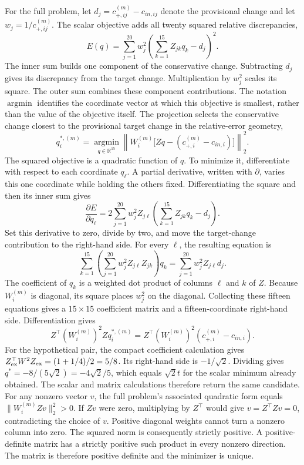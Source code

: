 For the full problem, let $d_j=c_{+,ij}^{(m)}-c_{in,ij}$ denote the provisional change and let $w_j=1/c_{+,ij}^{(m)}$. The scalar objective adds all twenty squared relative discrepancies,
\[
E(q)=\sum_{j=1}^{20}
w_j^2\left(\sum_{k=1}^{15}Z_{jk}q_k-d_j\right)^2.
\]
The inner sum builds one component of the conservative change. Subtracting $d_j$ gives its discrepancy from the target change. Multiplication by $w_j^2$ scales its square. The outer sum combines these component contributions. The notation $\operatorname{argmin}$ identifies the coordinate vector at which this objective is smallest, rather than the value of the objective itself. The projection selects the conservative change closest to the provisional target change in the relative-error geometry,
\begin{equation}
q_i^{*,(m)}=\underset{q\in\mathbb{R}^{15}}{\operatorname{argmin}}
\left\|W_i^{(m)}\bigl[Zq-(c_{+,i}^{(m)}-c_{in,i})\bigr]\right\|_2^2.
\label{eq:projection_weighted_least_squares}
\end{equation}
The squared objective is a quadratic function of $q$. To minimize it, differentiate with respect to each coordinate $q_\ell$. A partial derivative, written with $\partial$, varies this one coordinate while holding the others fixed. Differentiating the square and then its inner sum gives
\[
\frac{\partial E}{\partial q_\ell}
=2\sum_{j=1}^{20}w_j^2 Z_{j\ell}
\left(\sum_{k=1}^{15}Z_{jk}q_k-d_j\right).
\]
Set this derivative to zero, divide by two, and move the target-change contribution to the right-hand side. For every $\ell$, the resulting equation is
\[
\sum_{k=1}^{15}\left(\sum_{j=1}^{20}w_j^2Z_{j\ell}Z_{jk}\right)q_k
=\sum_{j=1}^{20}w_j^2Z_{j\ell}d_j.
\]
The coefficient of $q_k$ is a weighted dot product of columns $\ell$ and $k$ of $Z$. Because $W_i^{(m)}$ is diagonal, its square places $w_j^2$ on the diagonal. Collecting these fifteen equations gives a $15\times15$ coefficient matrix and a fifteen-coordinate right-hand side. Differentiation gives
\begin{equation}
Z^\top(W_i^{(m)})^2Zq_i^{*,(m)}
=Z^\top(W_i^{(m)})^2(c_{+,i}^{(m)}-c_{in,i}).
\label{eq:projection_normal_conditions}
\end{equation}
For the hypothetical pair, the compact coefficient calculation gives $Z_{\rm ex}^\top W^2Z_{\rm ex}=(1+1/4)/2=5/8$. Its right-hand side is $-1/\sqrt2$. Dividing gives $q^*=-8/(5\sqrt2)=-4\sqrt2/5$, which equals $\sqrt2t$ for the scalar minimum already obtained. The scalar and matrix calculations therefore return the same candidate. For any nonzero vector $v$, the full problem's associated quadratic form equals $\|W_i^{(m)}Zv\|_2^2>0$. If $Zv$ were zero, multiplying by $Z^\top$ would give $v=Z^\top Zv=0$, contradicting the choice of $v$. Positive diagonal weights cannot turn a nonzero column into zero. The squared norm is consequently strictly positive. A positive-definite matrix has a strictly positive such product in every nonzero direction. The matrix is therefore positive definite and the minimizer is unique.


